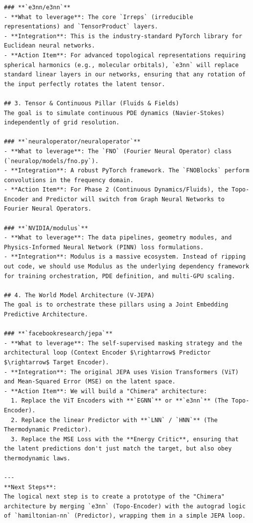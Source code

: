\documentclass[11pt,a4paper]{article}
\begin{document}
\begin{lstlisting}[language={}, caption={}, basicstyle=\ttfamily\footnotesize, breaklines=true]
### **`e3nn/e3nn`**
- **What to leverage**: The core `Irreps` (irreducible representations) and `TensorProduct` layers.
- **Integration**: This is the industry-standard PyTorch library for Euclidean neural networks.
- **Action Item**: For advanced topological representations requiring spherical harmonics (e.g., molecular orbitals), `e3nn` will replace standard linear layers in our networks, ensuring that any rotation of the input perfectly rotates the latent tensor.

## 3. Tensor & Continuous Pillar (Fluids & Fields)
The goal is to simulate continuous PDE dynamics (Navier-Stokes) independently of grid resolution.

### **`neuraloperator/neuraloperator`**
- **What to leverage**: The `FNO` (Fourier Neural Operator) class (`neuralop/models/fno.py`).
- **Integration**: A robust PyTorch framework. The `FNOBlocks` perform convolutions in the frequency domain.
- **Action Item**: For Phase 2 (Continuous Dynamics/Fluids), the Topo-Encoder and Predictor will switch from Graph Neural Networks to Fourier Neural Operators.

### **`NVIDIA/modulus`**
- **What to leverage**: The data pipelines, geometry modules, and Physics-Informed Neural Network (PINN) loss formulations.
- **Integration**: Modulus is a massive ecosystem. Instead of ripping out code, we should use Modulus as the underlying dependency framework for training orchestration, PDE definition, and multi-GPU scaling.

## 4. The World Model Architecture (V-JEPA)
The goal is to orchestrate these pillars using a Joint Embedding Predictive Architecture.

### **`facebookresearch/jepa`**
- **What to leverage**: The self-supervised masking strategy and the architectural loop (Context Encoder $\rightarrow$ Predictor $\rightarrow$ Target Encoder).
- **Integration**: The original JEPA uses Vision Transformers (ViT) and Mean-Squared Error (MSE) on the latent space.
- **Action Item**: We will build a "Chimera" architecture:
  1. Replace the ViT Encoders with **`EGNN`** or **`e3nn`** (The Topo-Encoder).
  2. Replace the linear Predictor with **`LNN` / `HNN`** (The Thermodynamic Predictor).
  3. Replace the MSE Loss with the **Energy Critic**, ensuring that the latent predictions don't just match the target, but also obey thermodynamic laws.

---
**Next Steps**: 
The logical next step is to create a prototype of the "Chimera" architecture by merging `e3nn` (Topo-Encoder) with the autograd logic of `hamiltonian-nn` (Predictor), wrapping them in a simple JEPA loop.

\end{lstlisting}
\end{document}

